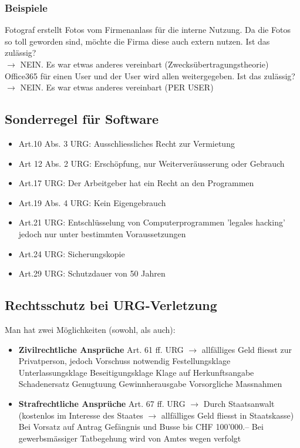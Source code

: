 \documentclass{report}
\theoremstyle{definition}
\theoremstyle{example}
\begin{document}
\subsubsection{Beispiele}
Fotograf erstellt Fotos vom Firmenanlass für die interne Nutzung. Da die Fotos so toll geworden sind, möchte die Firma diese auch extern nutzen. Ist das zulässig?\\
$\rightarrow$ NEIN. Es war etwas anderes vereinbart (Zwecksübertragungstheorie)\\

Office365 für einen User und der User wird allen weitergegeben. Ist das zulässig?\\
$\rightarrow$ NEIN. Es war etwas anderes vereinbart (PER USER)

\subsection{Sonderregel für Software}
\begin{itemize}
   \item Art.10 Abs. 3 URG: Ausschliessliches Recht zur Vermietung
   \item Art 12 Abs. 2 URG: Erschöpfung, nur Weiterveräusserung oder Gebrauch
   \item Art.17 URG: Der Arbeitgeber hat ein Recht an den Programmen
   \item Art.19 Abs. 4 URG: Kein Eigengebrauch
   \item Art.21 URG: Entschlüsselung von Computerprogrammen
   \subitem 'legales hacking' jedoch nur unter bestimmten Voraussetzungen 
   \item Art.24 URG: Sicherungskopie
   \item Art.29 URG: Schutzdauer von 50 Jahren
\end{itemize}

\subsection{Rechtsschutz bei URG-Verletzung}
Man hat zwei Möglichkeiten (sowohl, als auch):
\begin{itemize}
   \item \textbf{Zivilrechtliche Ansprüche} Art. 61 ff. URG $\rightarrow$ allfälliges Geld fliesst zur Privatperson, jedoch Vorschuss notwendig
   \subitem Festellungsklage
   \subitem Unterlassungsklage
   \subitem Beseitigungsklage
   \subitem Klage auf Herkunftsangabe
   \subitem Schadenersatz
   \subitem Genugtuung
   \subitem Gewinnherausgabe
   \subitem Vorsorgliche Massnahmen 
   \item \textbf{Strafrechtliche Ansprüche} Art. 67 ff. URG $\rightarrow$ Durch Staatsanwalt (kostenlos im Interesse des Staates $\rightarrow$ allfälliges Geld fliesst in Staatskasse)
   \subitem Bei Vorsatz auf Antrag Gefängnis und Busse bis CHF 100'000.--
   \subitem Bei gewerbsmässiger Tatbegehung wird von Amtes wegen verfolgt 
\end{itemize}
\end{document}
